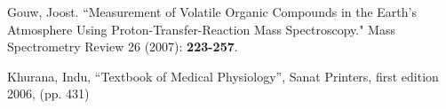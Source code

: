 \documentclass[prb,preprint]{revtex4-1}
\begin{document}
\newpage

\begin{thebibliography}{99}

 Gouw, Joost. ``Measurement of Volatile Organic Compounds in the Earth's Atmosphere Using Proton-Transfer-Reaction Mass Spectroscopy." Mass Spectrometry Review 26 (2007): \textbf{223-257}.

 Khurana, Indu, ``Textbook of Medical Physiology'', Sanat Printers, first edition 2006, (pp. 431)

\end{thebibliography}
\end{document}
